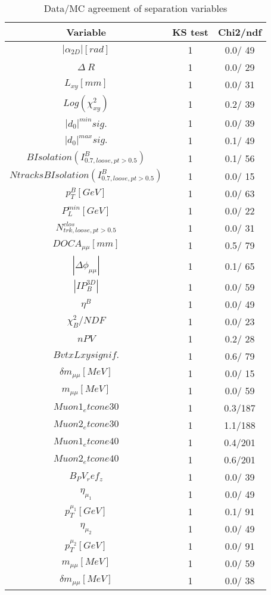 \documentclass{article}
\begin{document}
\begin{table}[htbp]
\caption{\label{tab:sepVars}Data/MC agreement of separation variables}
\begin{center}
\begin{tabular}{c|c|c}
Variable & KS test & Chi2/ndf \\
\hline
$|\alpha_{2D}| [rad]$ & 1 &   0.0/ 49\\
\hline
$\Delta~R$ & 1 &   0.0/ 29\\
\hline
$L_{xy} [mm]$ & 1 &   0.0/ 31\\
\hline
$Log(\chi^{2}_{xy})$ & 1 &   0.2/ 39\\
\hline
$|d_{0}|^{min} sig.$ & 1 &   0.0/ 39\\
\hline
$|d_{0}|^{max} sig.$ & 1 &   0.1/ 49\\
\hline
$B Isolation (I^{B}_{0.7, loose, pt>0.5})$ & 1 &   0.1/ 56\\
\hline
$Ntracks B Isolation (I^{B}_{0.7, loose, pt>0.5})$ & 1 &   0.0/ 15\\
\hline
$p_{T}^{B} [GeV]$ & 1 &   0.0/ 63\\
\hline
$P^{min}_{L} [GeV]$ & 1 &   0.0/ 22\\
\hline
$N^{clos}_{trk, loose, pt>0.5}$ & 1 &   0.0/ 31\\
\hline
$DOCA_{\mu\mu} [mm]$ & 1 &   0.5/ 79\\
\hline
$|\Delta\phi_{\mu\mu}|$ & 1 &   0.1/ 65\\
\hline
$|IP_{B}^{3D}|$ & 1 &   0.0/ 59\\
\hline
$\eta^{B}$ & 1 &   0.0/ 49\\
\hline
$\chi^{2}_{B}/NDF$ & 1 &   0.0/ 23\\
\hline
$nPV$ & 1 &   0.2/ 28\\
\hline
$BvtxLxy signif.$ & 1 &   0.6/ 79\\
\hline
$\delta m_{\mu\mu} [MeV]$ & 1 &   0.0/ 15\\
\hline
$m_{\mu\mu} [MeV]$ & 1 &   0.0/ 59\\
\hline
$Muon1_etcone30$ & 1 &   0.3/187\\
\hline
$Muon2_etcone30$ & 1 &   1.1/188\\
\hline
$Muon1_etcone40$ & 1 &   0.4/201\\
\hline
$Muon2_etcone40$ & 1 &   0.6/201\\
\hline
$B_PV_ref_z$ & 1 &   0.0/ 39\\
\hline
$\eta_{\mu_{1}}$ & 1 &   0.0/ 49\\
\hline
$p_{T}^{\mu_{1}} [GeV]$ & 1 &   0.1/ 91\\
\hline
$\eta_{\mu_{2}}$ & 1 &   0.0/ 49\\
\hline
$p_{T}^{\mu_{2}} [GeV]$ & 1 &   0.0/ 91\\
\hline
$m_{\mu\mu} [MeV]$ & 1 &   0.0/ 59\\
\hline
$\delta m_{\mu\mu} [MeV]$ & 1 &   0.0/ 38\\
\hline
\end{tabular}
\end{center}
\end{table}
\end{document}
